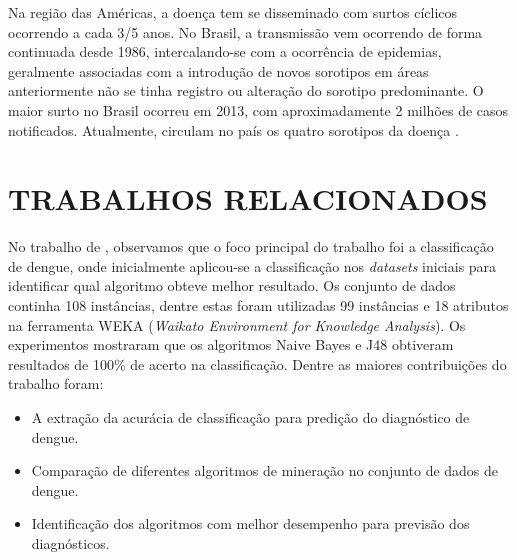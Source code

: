 \documentclass[
	12pt,				%
	openright,			%
	oneside,	
	a4paper,				%
	english,				%
	brazil				%
]{abntex2/abntex2} %
\begin{document}
	Na região das Américas, a doença tem se disseminado com surtos cíclicos ocorrendo a cada 3/5 anos. No Brasil, a transmissão vem ocorrendo de forma continuada desde 1986, intercalando-se com a ocorrência de epidemias, geralmente associadas com a introdução de novos sorotipos em áreas anteriormente não se tinha registro ou alteração do sorotipo predominante. O maior surto no Brasil ocorreu em 2013, com aproximadamente 2 milhões de casos notificados. Atualmente, circulam no país os quatro sorotipos da doença \cite{MS:2015}.
	

	
	\section{TRABALHOS RELACIONADOS}	
	
	No trabalho de \cite{shakil:2015}, observamos que o foco principal do trabalho foi a classificação de dengue, onde inicialmente aplicou-se a classificação nos \textit{datasets} iniciais para identificar qual algoritmo obteve melhor resultado. Os conjunto de dados continha 108 instâncias, dentre estas foram utilizadas 99 instâncias e  18 atributos na ferramenta WEKA (\textit{Waikato Environment for Knowledge Analysis}). Os experimentos mostraram que os algoritmos Naive Bayes e J48 obtiveram resultados de 100\% de acerto na classificação. Dentre as maiores contribuições do trabalho foram:
	
	\begin{itemize}
		\item A extração da acurácia de classificação para predição do diagnóstico de dengue.
		\item Comparação de diferentes algoritmos de mineração no conjunto de dados de dengue.
		\item Identificação dos algoritmos com melhor desempenho para previsão dos diagnósticos.
	\end{itemize}
	
\end{document}
